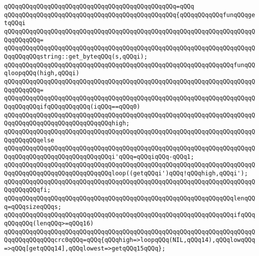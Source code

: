 \verb|qQQqqQQqqQQqqQQqqQQqqQQqqQQqqQQqqQQqqQQqqQQqqQQq=qQQq|\newline
\verb|qQQqqQQqqQQqqQQqqQQqqQQqqQQqqQQqqQQqqQQqqQQqqQQq{qQQqqQQqqQQqfunqQQqgetqQQqi|\newline
\verb|qQQqqQQqqQQqqQQqqQQqqQQqqQQqqQQqqQQqqQQqqQQqqQQqqQQqqQQqqQQqqQQqqQQqqQQqqQQqqQQq=|\newline
\verb|qQQqqQQqqQQqqQQqqQQqqQQqqQQqqQQqqQQqqQQqqQQqqQQqqQQqqQQqqQQqqQQqqQQqqQQqqQQqqQQqstring::get_byteqQQq(s,qQQqi);|\newline
\newline
\verb|qQQqqQQqqQQqqQQqqQQqqQQqqQQqqQQqqQQqqQQqqQQqqQQqqQQqqQQqqQQqqQQqfunqQQqloopqQQq(high,qQQqi)|\newline
\verb|qQQqqQQqqQQqqQQqqQQqqQQqqQQqqQQqqQQqqQQqqQQqqQQqqQQqqQQqqQQqqQQqqQQqqQQqqQQqqQQq=|\newline
\verb|qQQqqQQqqQQqqQQqqQQqqQQqqQQqqQQqqQQqqQQqqQQqqQQqqQQqqQQqqQQqqQQqqQQqqQQqqQQqqQQqifqQQqqQQqqQQq(iqQQq==qQQq0)|\newline
\newline
\verb|qQQqqQQqqQQqqQQqqQQqqQQqqQQqqQQqqQQqqQQqqQQqqQQqqQQqqQQqqQQqqQQqqQQqqQQqqQQqqQQqqQQqqQQqqQQqqQQqqQQqhigh;|\newline
\verb|qQQqqQQqqQQqqQQqqQQqqQQqqQQqqQQqqQQqqQQqqQQqqQQqqQQqqQQqqQQqqQQqqQQqqQQqqQQqqQQqelse|\newline
\verb|qQQqqQQqqQQqqQQqqQQqqQQqqQQqqQQqqQQqqQQqqQQqqQQqqQQqqQQqqQQqqQQqqQQqqQQqqQQqqQQqqQQqqQQqqQQqqQQqqQQqi'qQQq=qQQqiqQQq-qQQq1;|\newline
\verb|qQQqqQQqqQQqqQQqqQQqqQQqqQQqqQQqqQQqqQQqqQQqqQQqqQQqqQQqqQQqqQQqqQQqqQQqqQQqqQQqqQQqqQQqqQQqqQQqqQQqloop((getqQQqi')qQQq!qQQqhigh,qQQqi');|\newline
\verb|qQQqqQQqqQQqqQQqqQQqqQQqqQQqqQQqqQQqqQQqqQQqqQQqqQQqqQQqqQQqqQQqqQQqqQQqqQQqqQQqfi;|\newline
\newline
\verb|qQQqqQQqqQQqqQQqqQQqqQQqqQQqqQQqqQQqqQQqqQQqqQQqqQQqqQQqqQQqqQQqlenqQQq=qQQqsizeqQQqs;|\newline
\newline
\verb|qQQqqQQqqQQqqQQqqQQqqQQqqQQqqQQqqQQqqQQqqQQqqQQqqQQqqQQqqQQqqQQqifqQQqqQQqqQQq(lenqQQq>=qQQq16)|\newline
\newline
\verb|qQQqqQQqqQQqqQQqqQQqqQQqqQQqqQQqqQQqqQQqqQQqqQQqqQQqqQQqqQQqqQQqqQQqqQQqqQQqqQQqqQQqcrc0qQQq=qQQq{qQQqhigh=>loopqQQq(NIL,qQQq14),qQQqlowqQQq=>qQQq[getqQQq14],qQQqlowest=>getqQQq15qQQq};|\newline
\newline
